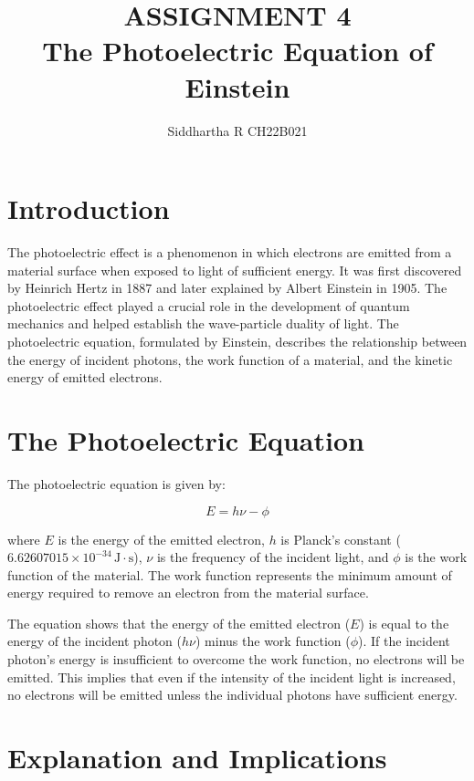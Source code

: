 \documentclass[a4paper, 11pt]{article}
\title{ASSIGNMENT 4 \\ The Photoelectric Equation of Einstein}
\author{Siddhartha R CH22B021}
\date{}
\begin{document}
\maketitle

\section{Introduction}

The photoelectric effect is a phenomenon in which electrons are emitted from a material surface when exposed to light of sufficient energy. It was first discovered by Heinrich Hertz in 1887 and later explained by Albert Einstein in 1905. The photoelectric effect played a crucial role in the development of quantum mechanics and helped establish the wave-particle duality of light. The photoelectric equation, formulated by Einstein, describes the relationship between the energy of incident photons, the work function of a material, and the kinetic energy of emitted electrons.

\section{The Photoelectric Equation}

The photoelectric equation is given by:

\begin{equation}
    E = h\nu - \phi
\end{equation}

where $E$ is the energy of the emitted electron, $h$ is Planck's constant ($6.62607015 \times 10^{-34}\, \text{J}\cdot \text{s}$), $\nu$ is the frequency of the incident light, and $\phi$ is the work function of the material. The work function represents the minimum amount of energy required to remove an electron from the material surface.

The equation shows that the energy of the emitted electron ($E$) is equal to the energy of the incident photon ($h\nu$) minus the work function ($\phi$). If the incident photon's energy is insufficient to overcome the work function, no electrons will be emitted. This implies that even if the intensity of the incident light is increased, no electrons will be emitted unless the individual photons have sufficient energy.


\section{Explanation and Implications}
\end{document}
